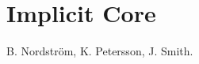 \documentclass[11pt]{article}
\newtheorem{theorem}{Theorem}[section]
\begin{document}
% 
% 
% 
% 
% 
% 
% 
% 
% 
% 
% 
% 
% 
% 
% 
% 
% 
% 


\section{Implicit Core}

\begin{thebibliography}{9}

B. Nordstr\"om, K. Petersson, J. Smith.



\end{thebibliography}
\end{document}
